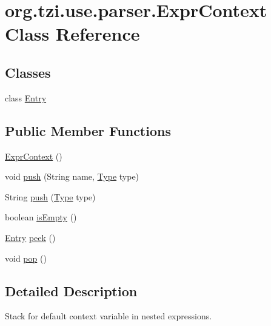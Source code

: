 \hypertarget{classorg_1_1tzi_1_1use_1_1parser_1_1_expr_context}{\section{org.\-tzi.\-use.\-parser.\-Expr\-Context Class Reference}
\label{classorg_1_1tzi_1_1use_1_1parser_1_1_expr_context}
}
\subsection*{Classes}
\begin{DoxyCompactItemize}
\item 
class \hyperlink{classorg_1_1tzi_1_1use_1_1parser_1_1_expr_context_1_1_entry}{Entry}
\end{DoxyCompactItemize}
\subsection*{Public Member Functions}
\begin{DoxyCompactItemize}
\item 
\hyperlink{classorg_1_1tzi_1_1use_1_1parser_1_1_expr_context_a8bbeafa138ce18dc4e542b0becdcce26}{Expr\-Context} ()
\item 
void \hyperlink{classorg_1_1tzi_1_1use_1_1parser_1_1_expr_context_adc5f66afcdcd5f0e0d3c5f08c0305b43}{push} (String name, \hyperlink{interfaceorg_1_1tzi_1_1use_1_1uml_1_1ocl_1_1type_1_1_type}{Type} type)
\item 
String \hyperlink{classorg_1_1tzi_1_1use_1_1parser_1_1_expr_context_a9e51b777589236d0c2b56eb5d0e1d155}{push} (\hyperlink{interfaceorg_1_1tzi_1_1use_1_1uml_1_1ocl_1_1type_1_1_type}{Type} type)
\item 
boolean \hyperlink{classorg_1_1tzi_1_1use_1_1parser_1_1_expr_context_a0eb266b4aaf275915bcd423784e1c720}{is\-Empty} ()
\item 
\hyperlink{classorg_1_1tzi_1_1use_1_1parser_1_1_expr_context_1_1_entry}{Entry} \hyperlink{classorg_1_1tzi_1_1use_1_1parser_1_1_expr_context_a9c4078758bd6f12f5d6b711d6ceaa841}{peek} ()
\item 
void \hyperlink{classorg_1_1tzi_1_1use_1_1parser_1_1_expr_context_a939dd8d3226035e66625ef29665383e7}{pop} ()
\end{DoxyCompactItemize}


\subsection{Detailed Description}
Stack for default context variable in nested expressions.

